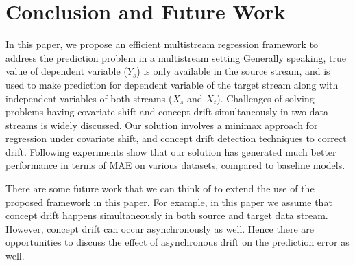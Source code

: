 \documentclass[conference,compsoc]{IEEEtran}
\begin{document}

\section{Conclusion and Future Work}
\label{conclusion}

In this paper, we propose an efficient multistream regression
framework to address the prediction problem in a multistream setting
Generally speaking, true value of dependent variable ($Y_s$) is only
available in the source stream, and is used to make
prediction for dependent variable of the target stream along with
independent variables of both streams ($X_s$ and $X_t$). 
Challenges of solving problems having covariate shift and
concept drift simultaneously in two data streams is widely
discussed. Our solution involves a minimax approach for
regression under covariate shift, and concept drift
detection techniques to correct drift. Following experiments
show that our solution has generated much better performance in
terms of MAE on various datasets, compared to baseline models.

There are some future work that we can think of to extend the use
of the proposed framework in this paper. For example, in this
paper we assume that concept drift happens
simultaneously in both source and target data stream. However,
concept drift can occur asynchronously as well. Hence there
are opportunities to discuss the effect of asynchronous drift on the prediction error as well.



\end{document}
